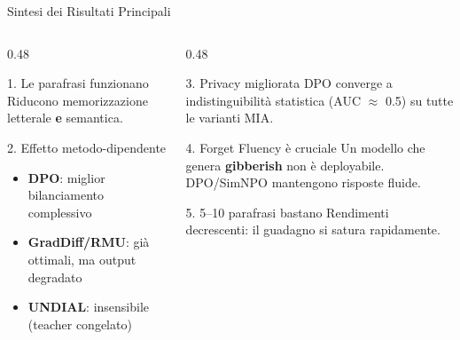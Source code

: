 \documentclass[aspectratio=169,11pt]{beamer}
\begin{document}
\begin{frame}{Sintesi dei Risultati Principali}
  \begin{columns}[T]
    \begin{column}{0.48\textwidth}
      \begin{block}{1. Le parafrasi funzionano}
        Riducono memorizzazione letterale \textbf{e} semantica.
      \end{block}
      \vspace{0.3em}
      \begin{block}{2. Effetto metodo-dipendente}
        \begin{itemize}
          \small
          \item \textbf{DPO}: miglior bilanciamento complessivo
          \item \textbf{GradDiff/RMU}: già ottimali, ma output degradato
          \item \textbf{UNDIAL}: insensibile (teacher congelato)
        \end{itemize}
      \end{block}
    \end{column}
    \begin{column}{0.48\textwidth}
      \begin{block}{3. Privacy migliorata}
        DPO converge a indistinguibilità statistica (AUC $\approx$ 0.5) su tutte le varianti MIA.
      \end{block}
      \vspace{0.3em}
      \begin{block}{4. Forget Fluency \`e cruciale}
        Un modello che genera \textbf{gibberish} non \`e deployabile. DPO/SimNPO mantengono risposte fluide.
      \end{block}
      \vspace{0.3em}
      \begin{block}{5. 5--10 parafrasi bastano}
        Rendimenti decrescenti: il guadagno si satura rapidamente.
      \end{block}
    \end{column}
  \end{columns}
\end{frame}
\end{document}
